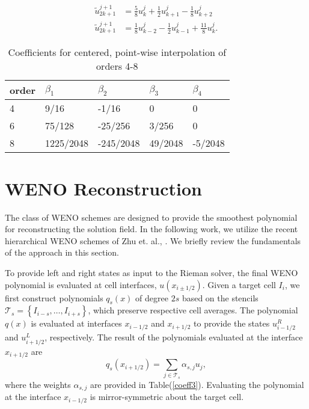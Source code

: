 \documentclass[]{article}
\begin{document}
    \begin{align}
        \tilde{u}^{j+1}_{2k+1} & = \frac{5}{8} u^{j}_{k}
        + \frac{1}{2} u^{j}_{k+1} - \frac{1}{8} u^{j}_{k+2} \\
        \tilde{u}^{j+1}_{2k+1} & = \frac{1}{8} u^{j}_{k-2}
        - \frac{1}{2} u^{j}_{k-1} + \frac{11}{8} u^{j}_{k}.
    \end{align}
    \begin{table}[]
        \center
        \begin{tabular}{|l|l|l|l|l|}
        \hline
            order    & $\beta_{1}$ & $\beta_{2}$ & $\beta_{3}$ & $\beta_{4}$ \\ \hline
            4 & 9/16         & -1/16        & 0            & 0 \\ \hline
            6 & 75/128       & -25/256      & 3/256        & 0 \\ \hline
            8 & 1225/2048    & -245/2048    & 49/2048      & -5/2048 \\ \hline
        \end{tabular}
        \label{coeff2}
        \caption{Coefficients for centered, point-wise interpolation of orders 4-8}
    \end{table}

    \section{WENO Reconstruction}


        The class of WENO schemes are designed to provide the smoothest
        polynomial for reconstructing the solution field. In the following work,
        we utilize the recent hierarchical WENO schemes of Zhu et. al.,
        \cite{zhu2018}. We briefly review the fundamentals of the approach in
        this section.

        To provide left and right states as input to the Rieman solver, the
        final WENO polynomial is evaluated at cell interfaces, $u(x_{i\pm1/2})$.
        Given a target cell $I_{i}$, we first construct polynomials $q_{s}(x)$
        of degree $2s$ based on the stencils $\mathcal{T}_{s} = \left\{ I_{i-s},
        \dots, I_{i+s} \right\}$, which preserve respective cell averages.  The
        polynomial $q(x)$ is evaluated at interfaces $x_{i-1/2}$ and $x_{i+1/2}$
        to provide the states $u_{i-1/2}^{R}$ and $u_{i+1/2}^{L}$, respectively.
        The result of the polynomials evaluated at the interface $x_{i+1/2}$ are
        \begin{equation}
            q_{s}(x_{i+1/2}) = \sum_{j \in \mathcal{T}_{s}} \alpha_{s,j} u_{j},
        \end{equation}
        where the weights $\alpha_{s,j}$ are provided in Table(\ref{coeff3}).
        Evaluating the polynomial at the interface $x_{i-1/2}$ is
        mirror-symmetric about the target cell. \\
\end{document}
